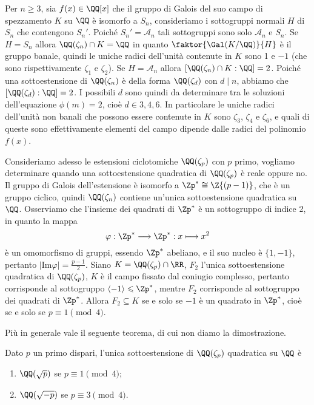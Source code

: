 \documentclass[11pt]{scrartcl}
\begin{document}
\begin{example}
    Per $n\geq 3$, sia $f(x) \in \QQ[x]$ che il gruppo di Galois del suo campo di spezzamento
    $K$ su $\QQ$ è isomorfo a $S_n$, consideriamo i sottogruppi normali $H$ di $S_n$
    che contengono $S_n'$. Poiché $S_n' = \mathcal{A}_n$ tali sottogruppi
    sono solo $\mathcal{A}_n$ e $S_n$. Se $H = S_n$ allora $\QQ(\zeta_n) \cap K = \nolinebreak\QQ$
    in quanto $\faktor{\Gal(K/\QQ)}{H}$ è il gruppo banale, quindi le uniche
    radici dell'unità contenute in $K$ sono 1 e $-1$ (che sono rispettivamente
    $\zeta_1$ e $\zeta_2$). Se $H = \mathcal{A}_n$
    allora $[\QQ(\zeta_n)\cap K: \QQ] = 2$. Poiché una sottoestensione di 
    $\QQ(\zeta_n)$ è della forma $\QQ(\zeta_d)$ con $d \mid n$, abbiamo
    che $[\QQ(\zeta_d):\QQ] = 2$. I possibili $d$ sono quindi da determinare
    tra le soluzioni dell'equazione $\phi(m) = 2$, cioè $d \in {3, 4, 6}$.
    In particolare le uniche radici dell'unità non banali che possono essere
    contenute in $K$ sono $\zeta_3$, $\zeta_4$ e $\zeta_6$, e quali di queste
    sono effettivamente elementi del campo dipende dalle radici del polinomio $f(x)$.
\end{example}

Consideriamo adesso le estensioni ciclotomiche $\QQ(\zeta_p)$ con $p$ primo,
vogliamo determinare quando una sottoestensione quadratica di $\QQ(\zeta_p)$
è reale oppure no. Il gruppo di Galois dell'estensione è isomorfo a $\Zp^* \cong 
\Z{(p -1)}$, che è un gruppo ciclico, quindi $\QQ(\zeta_n)$ contiene un'unica 
sottoestensione quadratica su $\QQ$. Osserviamo che l'insieme dei quadrati 
di $\Zp^*$ è un sottogruppo di indice 2, in quanto la mappa 
\[
    \varphi: \Zp^* \longrightarrow \Zp^*: x \longmapsto x^2
\]
è un omomorfismo di gruppi, essendo $\Zp^*$ abeliano, e il suo nucleo è $\{1, -1\}$,
pertanto $|\mathrm{Im}\varphi| = \displaystyle\frac{p - 1}{2}$. Siano $K = \QQ(\zeta_p)\cap \RR$,
$F_2$ l'unica sottoestensione quadratica di $\QQ(\zeta_p)$, $K$ è il campo 
fissato dal coniugio complesso, pertanto corrisponde al sottogruppo
$\langle -1\rangle \leqslant \Zp^*$, mentre $F_2$ corrisponde al sottogruppo
dei quadrati di $\Zp^*$. Allora $F_2 \subseteq K$ se e solo se $-1$ è un 
quadrato in $\Zp^*$, cioè se e solo se $p \equiv 1 \pmod 4$.

Più in generale vale il seguente teorema, di cui non diamo la dimostrazione.

\begin{theorem}
    Dato $p$ un primo dispari, l'unica sottoestensione di $\QQ(\zeta_p)$ 
    quadratica su $\QQ$ è
    \begin{enumerate}[(1)]
        \item $\QQ(\sqrt p)$ se $p \equiv 1 \pmod 4$;
        \item $\QQ(\sqrt{-p})$ se $p \equiv 3 \pmod 4$.
    \end{enumerate}
\end{theorem}   
\end{document}
